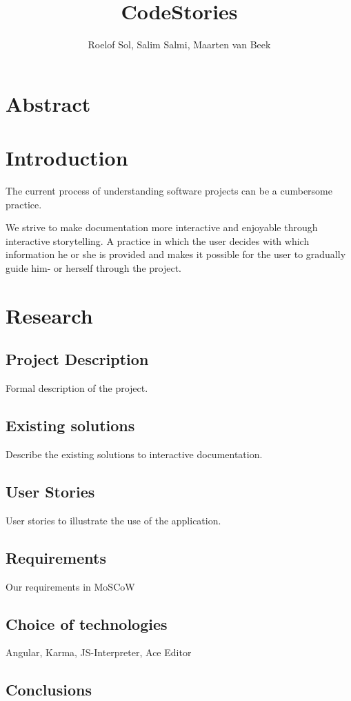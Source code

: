 \documentclass[12pt]{article}
\title{CodeStories}
\author{Roelof Sol, Salim Salmi, Maarten van Beek}
\date{}
\begin{document}
 
\maketitle
\section{Abstract}
\section{Introduction}
The current process of understanding software projects can be a cumbersome practice. 

We strive to make documentation more interactive and enjoyable through interactive storytelling. A practice in which the user 
decides with which information he or she is provided and makes it possible for the user to gradually guide him- or herself 
through the project.  

\section{Research}
\subsection{Project Description}
Formal description of the project. 

\subsection{Existing solutions}
Describe the existing solutions to interactive documentation.

\subsection{User Stories}
User stories to illustrate the use of the application. 

\subsection{Requirements}
Our requirements in MoSCoW

\subsection{Choice of technologies}
Angular, Karma, JS-Interpreter, Ace Editor

\subsection{Conclusions}
\end{document}
